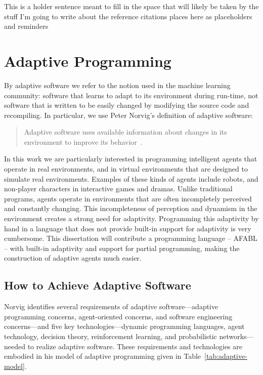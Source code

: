 \cite{shao2003new}

This is a holder sentence meant to fill in the space that will likely be taken by the stuff I'm going to write about the reference citations places here as placeholders and reminders


\section{Adaptive Programming}

By adaptive software we refer to the notion used in the machine learning community: software that learns to adapt to its environment during run-time, not software that is written to be easily changed by modifying the source code and recompiling.  In particular, we use Peter Norvig's definition of adaptive software:

\begin{quote}
Adaptive software uses available information about changes in its
environment to improve its behavior~\cite{norvig1998adaptive}.
\end{quote}

In this work we are particularly interested in programming intelligent agents that operate in real environments, and in virtual environments that are designed to simulate real environments.  Examples of these kinds of agents include robots, and non-player characters in interactive games and dramas.  Unlike traditional programs, agents operate in environments that are often incompletely perceived and constantly changing.  This incompleteness of perception and dynamism in the environment creates a strong need for adaptivity.  Programming this adaptivity by hand in a language that does not provide built-in support for adaptivity is very cumbersome.  This dissertation will contribute a programming language -- AFABL -- with built-in adaptivity and support for partial programming, making the construction of adaptive agents much easier.


\subsection{How to Achieve Adaptive Software}

Norvig identifies several requirements of adaptive
soft\-ware---adaptive programming concerns, agent-oriented concerns,
and software engineering concerns---and five key
technologies---dynamic programming languages, agent technology,
decision theory, reinforcement learning, and probabilistic
networks---needed to realize adaptive software.  These requirements
and technologies are embodied in his model of adaptive programming
given in Table~\ref{tab:adaptive-model}.

